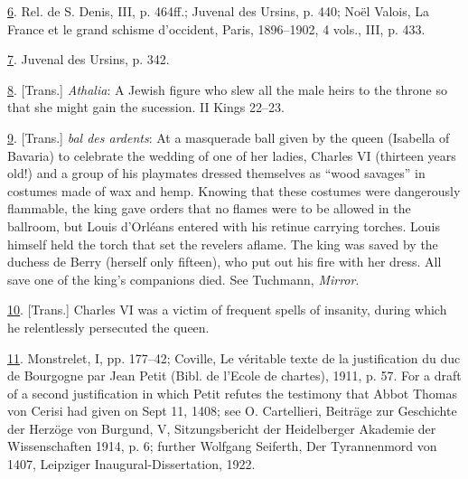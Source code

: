 \protect\hypertarget{23_NOTES.xhtmlux5cux23id_620}{\protect\hyperlink{18_Chapter_Eleven__THE_FORMS_OF_THO.xhtmlux5cux23id_619}{6}}.
Rel. de S. Denis, III, p. 464ff.; Juvenal des Ursins, p. 440; Noël
Valois, La France et le grand schisme d'occident, Paris, 1896--1902, 4
vols., III, p. 433.

\protect\hypertarget{23_NOTES.xhtmlux5cux23id_618}{\protect\hyperlink{18_Chapter_Eleven__THE_FORMS_OF_THO.xhtmlux5cux23id_617}{7}}.
Juvenal des Ursins, p. 342.

\protect\hypertarget{23_NOTES.xhtmlux5cux23page_429}{\protect\hyperlink{18_Chapter_Eleven__THE_FORMS_OF_THO.xhtmlux5cux23id_616}{8}}.
{[}Trans.{]} \emph{Athalia}: A Jewish figure who slew all the male heirs
to the throne so that she might gain the sucession. II Kings 22--23.

\protect\hypertarget{23_NOTES.xhtmlux5cux23id_615}{\protect\hyperlink{18_Chapter_Eleven__THE_FORMS_OF_THO.xhtmlux5cux23id_614}{9}}.
{[}Trans.{]} \emph{bal des ardents}: At a masquerade ball given by the
queen (Isabella of Bavaria) to celebrate the wedding of one of her
ladies, Charles VI (thirteen years old!) and a group of his playmates
dressed themselves as ``wood savages'' in costumes made of wax and hemp.
Knowing that these costumes were dangerously flammable, the king gave
orders that no flames were to be allowed in the ballroom, but Louis
d'Orléans entered with his retinue carrying torches. Louis himself held
the torch that set the revelers aflame. The king was saved by the
duchess de Berry (herself only fifteen), who put out his fire with her
dress. All save one of the king's companions died. See Tuchmann,
\emph{Mirror}.

\protect\hypertarget{23_NOTES.xhtmlux5cux23id_613}{\protect\hyperlink{18_Chapter_Eleven__THE_FORMS_OF_THO.xhtmlux5cux23id_612}{10}}.
{[}Trans.{]} Charles VI was a victim of frequent spells of insanity,
during which he relentlessly persecuted the queen.

\protect\hypertarget{23_NOTES.xhtmlux5cux23id_611}{\protect\hyperlink{18_Chapter_Eleven__THE_FORMS_OF_THO.xhtmlux5cux23id_610}{11}}.
Monstrelet, I, pp. 177--42; Coville, Le véritable texte de la
justification du duc de Bourgogne par Jean Petit (Bibl. de l'Ecole de
chartes), 1911, p. 57. For a draft of a second justification in which
Petit refutes the testimony that Abbot Thomas von Cerisi had given on
Sept 11, 1408; see O. Cartellieri, Beiträge zur Geschichte der Herzöge
von Burgund, V, Sitzungsbericht der Heidelberger Akademie der
Wissenschaften 1914, p. 6; further Wolfgang Seiferth, Der Tyrannenmord
von 1407, Leipziger Inaugural-Dissertation, 1922.

